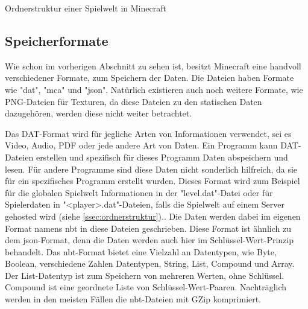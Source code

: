 \begin{listing}[htp]
    \caption{Ordnerstruktur einer Spielwelt in Minecraft\cite{minecraftFolderStruc}}
    \label{lst:ordnerStrukturMinecraft}
\end{listing}



\subsection{Speicherformate}
Wie schon im vorherigen Abschnitt zu sehen ist, besitzt Minecraft eine handvoll verschiedener Formate, zum Speichern der Daten. Die Dateien haben Formate wie "dat", "mca" und "json". Natürlich existieren auch noch weitere Formate, wie PNG-Dateien für Texturen, da diese Dateien zu den statischen Daten dazugehören, werden diese nicht weiter betrachtet.   

Das DAT-Format wird für jegliche Arten von Informationen verwendet, sei es Video, Audio, PDF oder jede andere Art von Daten. Ein Programm kann DAT-Dateien erstellen und spezifisch für dieses Programm Daten abspeichern und lesen. Für andere Programme sind diese Daten nicht sonderlich hilfreich, da sie für ein spezifisches Programm erstellt wurden.\cite{adobeWhatDAT} Dieses Format wird zum Beispiel für die globalen Spielwelt Informationen in der "level.dat"-Datei oder für Spielerdaten in "<player>.dat"-Dateien, falls die Spielwelt auf einem Server gehosted wird (siehe \ref{ssec:ordnerstruktur}).\cite{minecraftPlayerdatFormat}\cite{minecraftFolderStruc}. 
Die Daten werden dabei im eigenen Format namens \ac{nbt} in diese Dateien geschrieben. Diese Format ist ähnlich zu dem \ac{json}-Format, denn die Daten werden auch hier im Schlüssel-Wert-Prinzip behandelt. Das \ac{nbt}-Format bietet eine Vielzahl an Datentypen, wie Byte, Boolean, verschiedene Zahlen Datentypen, String, List, Compound und Array. Der List-Datentyp ist zum Speichern von mehreren Werten, ohne Schlüssel. Compound ist eine geordnete Liste von Schlüssel-Wert-Paaren. Nachträglich werden in den meisten Fällen die \ac{nbt}-Dateien mit GZip komprimiert.
\cite{minecraftNBT}

